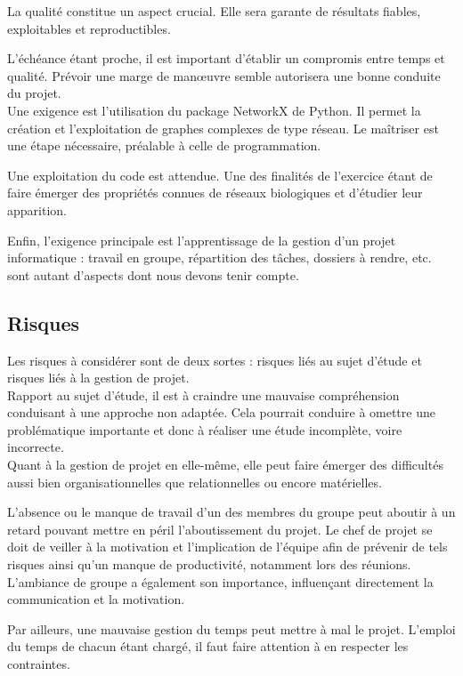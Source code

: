 La qualité constitue un aspect crucial. Elle sera garante de résultats fiables, exploitables et reproductibles. 

L'échéance étant proche, il est important d'établir un compromis entre temps et qualité. Prévoir une marge de manœuvre semble autorisera une bonne conduite du projet.\\

Une exigence est l'utilisation du package NetworkX de Python. Il permet la création et l'exploitation de graphes complexes de type réseau. Le maîtriser est une étape nécessaire, préalable à celle de programmation.

Une exploitation du code est attendue. Une des finalités de l'exercice étant de faire émerger des propriétés connues de réseaux biologiques et d'étudier leur apparition.

Enfin, l'exigence principale est l'apprentissage de la gestion d'un projet informatique : travail en groupe, répartition des tâches, dossiers à rendre, etc. sont autant d'aspects dont nous devons tenir compte.

\subsection{Risques}
Les risques à considérer sont de deux sortes : risques liés au sujet d'étude et risques liés à la gestion de projet.\\

Rapport au sujet d'étude, il est à craindre une mauvaise compréhension conduisant à une approche non adaptée. Cela pourrait conduire à omettre une problématique importante et donc à réaliser une étude incomplète, voire incorrecte.\\

Quant à la gestion de projet en elle-même, elle peut faire émerger des difficultés aussi bien organisationnelles que relationnelles ou encore matérielles.

L'absence ou le manque de travail d'un des membres du groupe peut aboutir à un retard pouvant mettre en péril l'aboutissement du projet. Le chef de projet se doit de veiller à la motivation et l'implication de l'équipe afin de prévenir de tels risques ainsi qu'un manque de productivité, notamment lors des réunions. L'ambiance de groupe a également son importance, influençant directement la communication et la motivation.

Par ailleurs, une mauvaise gestion du temps peut mettre à mal le projet. L'emploi du temps de chacun étant chargé, il faut faire attention à en respecter les contraintes.

